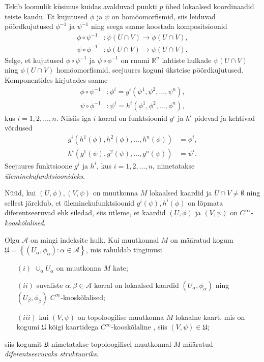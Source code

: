 \documentclass[12pt,a4paper,oneside]{article}
\theoremstyle{plain}
\theoremstyle{definition}
\numberwithin{equation}{section}
\def\R{{\mathbb R}}
\begin{document}
Tekib loomulik küsimus kuidas avalduvad punkti $p$ ühed lokaalsed 
koordinaadid teiste kaudu. Et kujutused $\phi$ ja $\psi$ on 
homöomorfismid, siis leiduvad pöördkujutused $\phi^{-1}$ ja 
$\psi^{-1}$ ning seega saame koostada kompositsioonid
\begin{align*}
\phi \circ \psi^{-1} &: \psi\left(U \cap V\right) \rightarrow 
\phi\left(U \cap V\right), \\
\psi \circ \phi^{-1} &: \phi\left(U \cap V\right) \rightarrow 
\psi\left(U \cap V\right).
\end{align*}
Selge, et kujutused $\phi \circ \psi^{-1}$ ja $\psi \circ 
\phi^{-1}$ on ruumi $\R^n$ lahtiste hulkade 
$\psi\left(U \cap V\right)$ ning $\phi \left(U \cap V\right)$ 
homöomorfismid, seejuures koguni üksteise pöördkujutused. 
Komponentides kirjutades saame
\begin{align*}
\phi \circ \psi^{-1} &: \phi^i = g^i \left(\psi^1, \psi^2, 
\ldots, \psi^n\right), \\
\psi \circ \phi^{-1} &: \psi^i = h^i \left(\phi^1, \phi^2, 
\ldots, \phi^n\right),
\end{align*}
kus $i = 1, 2, \ldots, n$. Niisiis iga $i$ korral on funktsioonid 
$g^i$ ja $h^i$ pidevad ja kehtivad võrdused
\begin{align*}
g^i \left(h^1\left(\phi\right), h^2\left(\phi\right), \ldots, 
h^n\left(\phi\right)\right) &= \phi^i, \\
h^i \left(g^1\left(\psi\right), g^2\left(\psi\right), \ldots, 
g^n\left(\psi\right)\right) &= \psi^i.
\end{align*}
Seejuures funktsioone $g^i$ ja $h^i$, kus $i = 1, 2, \ldots, n$, 
nimetatakse \emph{üleminekufunktsioo\-nideks}. 

Nüüd, kui $\left(U, \phi\right), \left(V, \psi\right)$ on muutkonna 
$M$ lokaalsed kaardid ja $U \cap V \neq \emptyset$ ning sellest 
järeldub, et üleminekufunktsioonid 
$g^i\left(\psi\right), h^i\left(\phi\right)$ on lõpmata 
diferentseeruvad ehk siledad, siis ütleme, et kaardid 
$\left(U, \phi\right)$ ja $\left(V, \psi\right)$ on 
$C^{\infty}$\emph{-kooskõlalised}.

Olgu $\mathcal{A}$ on mingi indeksite hulk. Kui muutkonnal $M$ on 
määratud kogum $\mathfrak{U} = \left\lbrace \left(U_\alpha, 
\phi_\alpha\right) : \alpha \in \mathcal{A} \right\rbrace$, 
mis rahuldab tingimusi
\begin{itemize}
\item [$\left(i\right)$] $\cup_\alpha U_\alpha$ on muutkonna $M$ kate;
\item [$\left(ii\right)$] suvaliste $\alpha, \beta \in \mathcal{A}$ 
korral on lokaalsed kaardid $\left(U_\alpha, \phi_\alpha\right)$ ning 
$\left(U_\beta, \phi_\beta\right)$ $C^\infty$-kooskõlalised;
\item [$\left(iii\right)$] kui $\left(V, \psi\right)$ on topoloogilise 
muutkonna $M$ lokaalne kaart, mis on kogumi $\mathfrak{U}$ kõigi 
kaartidega $C^\infty$-kooskõlaline , siis 
$\left(V, \psi\right) \in \mathfrak{U}$;
\end{itemize}
siis kogumit $\mathfrak{U}$ nimetatakse topoloogilisel muutkonnal 
$M$ määratud \emph{diferentseeruvaks struktuuriks}.
\end{document}
